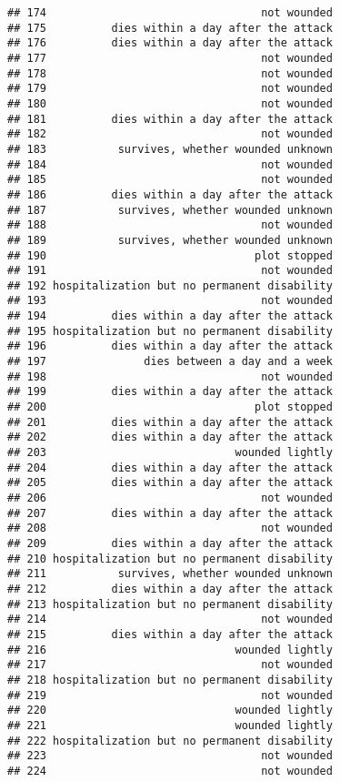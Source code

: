 \documentclass[
]{article}
\begin{document}
\begin{verbatim}
## 174                                 not wounded
## 175          dies within a day after the attack
## 176          dies within a day after the attack
## 177                                 not wounded
## 178                                 not wounded
## 179                                 not wounded
## 180                                 not wounded
## 181          dies within a day after the attack
## 182                                 not wounded
## 183           survives, whether wounded unknown
## 184                                 not wounded
## 185                                 not wounded
## 186          dies within a day after the attack
## 187           survives, whether wounded unknown
## 188                                 not wounded
## 189           survives, whether wounded unknown
## 190                                plot stopped
## 191                                 not wounded
## 192 hospitalization but no permanent disability
## 193                                 not wounded
## 194          dies within a day after the attack
## 195 hospitalization but no permanent disability
## 196          dies within a day after the attack
## 197               dies between a day and a week
## 198                                 not wounded
## 199          dies within a day after the attack
## 200                                plot stopped
## 201          dies within a day after the attack
## 202          dies within a day after the attack
## 203                             wounded lightly
## 204          dies within a day after the attack
## 205          dies within a day after the attack
## 206                                 not wounded
## 207          dies within a day after the attack
## 208                                 not wounded
## 209          dies within a day after the attack
## 210 hospitalization but no permanent disability
## 211           survives, whether wounded unknown
## 212          dies within a day after the attack
## 213 hospitalization but no permanent disability
## 214                                 not wounded
## 215          dies within a day after the attack
## 216                             wounded lightly
## 217                                 not wounded
## 218 hospitalization but no permanent disability
## 219                                 not wounded
## 220                             wounded lightly
## 221                             wounded lightly
## 222 hospitalization but no permanent disability
## 223                                 not wounded
## 224                                 not wounded

\end{verbatim}
\end{document}
